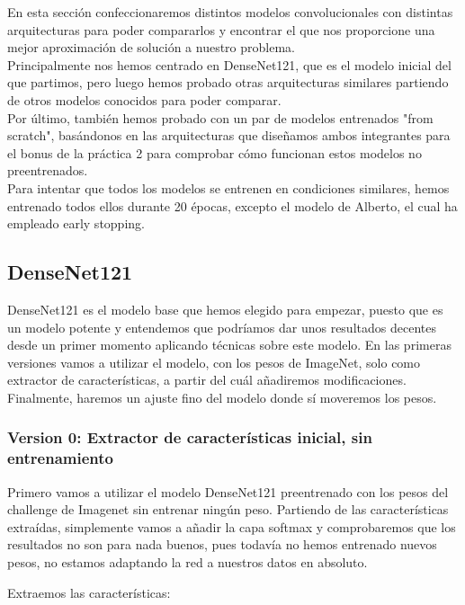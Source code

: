 \documentclass[11pt,a4paper]{article}
\theoremstyle{definition}
\begin{document}
En esta sección confeccionaremos distintos modelos convolucionales con distintas arquitecturas para poder compararlos y encontrar el que nos proporcione una mejor aproximación de solución a nuestro problema.\\

Principalmente nos hemos centrado en DenseNet121, que es el modelo inicial del que partimos, pero luego hemos probado otras arquitecturas similares partiendo de otros modelos conocidos para poder comparar.\\

Por último, también hemos probado con un par de modelos entrenados "from scratch", basándonos en las arquitecturas  que diseñamos ambos integrantes para el bonus de la práctica 2 para comprobar cómo funcionan estos modelos no preentrenados.\\

Para intentar que todos los modelos se entrenen en condiciones similares, hemos entrenado todos ellos durante 20 épocas, excepto el modelo de Alberto, el cual ha empleado early stopping.

\subsection{DenseNet121}

DenseNet121 es el modelo base que hemos elegido para empezar, puesto que es un modelo potente y entendemos que podríamos dar unos resultados decentes desde un primer momento aplicando técnicas sobre este modelo. En las primeras versiones vamos a utilizar el modelo, con los pesos de ImageNet, solo como extractor de características, a partir del cuál añadiremos modificaciones. Finalmente, haremos un ajuste fino del modelo donde sí moveremos los pesos.

\subsubsection{Version 0: Extractor de características inicial, sin entrenamiento}

Primero vamos a utilizar el modelo DenseNet121 preentrenado con los pesos del challenge de Imagenet sin entrenar ningún peso. Partiendo de las características extraídas, simplemente vamos a añadir la capa softmax y comprobaremos que los resultados no son para nada buenos, pues todavía no hemos entrenado nuevos pesos, no estamos adaptando la red a nuestros datos en absoluto.

Extraemos las características:
\end{document}
